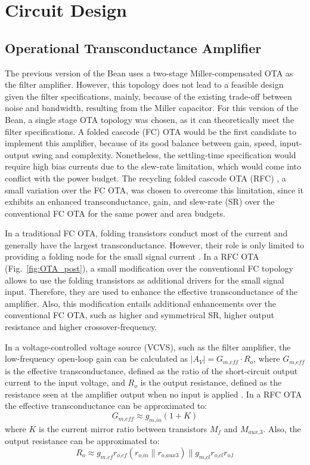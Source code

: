 \section{Circuit Design}
\subsection{Operational Transconductance Amplifier}
The previous version of the Bean uses a two-stage Miller-compensated OTA as the filter amplifier. However, this topology does not lead to a feasible design given the filter specifications, mainly, because of the existing trade-off between noise and bandwidth, resulting from the Miller capacitor. For this version of the Bean, a single stage OTA topology was chosen, as it can theoretically meet the filter specifications.  A folded cascode (FC) OTA would be the first candidate to implement this amplifier, because of its good balance between gain, speed, input-output swing and complexity. Nonetheless, the settling-time specification would require high bias currents due to the slew-rate limitation, which would come into conflict with the power budget. The recycling folded cascode OTA (RFC) \citep{assaad101}, a small variation over the FC OTA, was chosen to overcome this limitation, since it exhibits an enhanced transconductance, gain, and slew-rate (SR) over the conventional FC OTA for the same power and area budgets.

In a traditional FC OTA, folding transistors conduct most of the current and generally have the largest transconductance. However, their role is only limited to providing a folding node for the small signal current \citep{assaad101}. In a RFC OTA (Fig.~\ref{fig:OTA_post}), a small modification over the conventional FC topology allows to use the folding transistors as additional drivers for the small signal input. Therefore, they are used to enhance the effective transconductance of the amplifier. Also, this modification entails additional enhancements over the conventional FC OTA, such as higher and symmetrical SR, higher output resistance and higher crossover-frequency.

In a voltage-controlled voltage source (VCVS), such as the filter amplifier, the low-frequency \mbox{open-loop} gain can be calculated as $|A_V| = G_\textit{m,eff}  \cdot R_\textit{o}$, where $G_\textit{m,eff}$ is the effective transconductance, defined as the ratio of the short-circuit output current to the input voltage, and $R_o$ is the output resistance, defined as the resistance seen at the amplifier output when no input is applied \citep{rashid101}. In a RFC OTA the effective transconductance can be approximated to:
\begin{equation}
G_\textit{m,eff} \approx g_\textit{m,in}(1+K)\label{eq:gmeff}
\end{equation}
where $K$ is the current mirror ratio between transistors $M_f$ and $M_\textit{aux,3}$. Also, the output resistance can be approximated to:
\begin{equation}
R_\textit{o} \approx g_\textit{m,cf}r_\textit{o,cf}\left(r_\textit{o,in}\parallel r_\textit{o,aux3} \right) \parallel g_\textit{m,cl} r_\textit{o,cl} r_\textit{o,l}
\end{equation}

